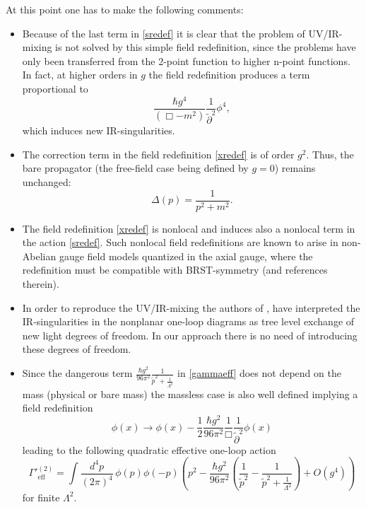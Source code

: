 \documentclass[a4paper,12pt]{article}
\begin{document}
At this point one has to make the following comments:
\begin{itemize}
\item Because of the last term in \eqref{sredef} it is clear that the problem of UV/IR-mixing is not solved by this simple field redefinition, since the problems have only been transferred from the 2-point function to higher n-point functions. In fact, at higher orders in $g$ the field redefinition produces a term proportional to 
\begin{equation}
 \frac{\hbar g^4}{(\Box - m^2)} \frac{1}{\tilde{\partial}^2} \phi^4,
\end{equation}
which induces new IR-singularities.
\item The correction term in the field redefinition \eqref{xredef} is of order $g^2$. Thus, the bare propagator (the free-field case being defined by $g=0$) remains unchanged:
  \begin{equation}
    \Delta(p) = \frac{1}{p^2 + m^2}.
  \end{equation}
\item The field redefinition \eqref{xredef} is nonlocal and induces also a nonlocal term in the action \eqref{sredef}. Such nonlocal field redefinitions are known to arise in non-Abelian gauge field models quantized in the axial gauge, where the redefinition must be compatible with BRST-symmetry \cite{Boresch:1998} (and references therein).
\item In order to reproduce the UV/IR-mixing the authors of \cite{Minwalla:1999px}, \cite{VanRaamsdonk:2000rr} have interpreted the IR-singularities in the nonplanar one-loop diagrams as tree level exchange of new light degrees of freedom. In our approach there is no need of introducing these degrees of freedom.
\item Since the dangerous term $\frac{\hbar g^2}{96 \pi^2} \frac{1}{\tilde{p}^2 + \frac{1}{\Lambda^2}}$ in \eqref{gammaeff} does not depend on the mass (physical or bare mass) the massless case is also well defined implying a field redefinition
  \begin{equation}
    \phi(x) \rightarrow  \phi(x) - \frac{1}{2} \frac{\hbar g^2}{96 \pi^2} 
      \frac{1}{\Box} \frac{1}{\tilde{\partial}^2} \phi(x)
  \end{equation}
leading to the following quadratic effective one-loop action
  \begin{equation}
    {\Gamma'}^{{(2)}}_{\mathrm{eff}} = \int \frac{d^4 \! p}{(2 \pi)^4} \, 
      \phi(p) \phi(-p) \left(p^2 -  \frac{\hbar g^2}{96 \pi^2} \left( 
        \frac{1}{\tilde{p}^2} - \frac{1}{\tilde{p}^2 + \frac{1}{\Lambda^2}} 
          \right) + O(g^4) \right)  
  \end{equation}
for finite $\Lambda^2$.
\end{itemize}
\end{document}

